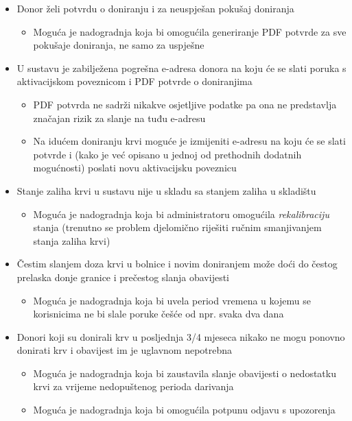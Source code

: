 {\begin{itemize}
                \item Donor želi potvrdu o doniranju i za neuspješan pokušaj doniranja
                \begin{itemize}
                    \item Moguća je nadogradnja koja bi omogućila generiranje PDF potvrde za sve pokušaje doniranja, ne samo za uspješne
                \end{itemize}
                
                \item U sustavu je zabilježena pogrešna e-adresa donora na koju će se slati poruka s aktivacijskom poveznicom i PDF potvrde o doniranjima
                \begin{itemize}
                    \item PDF potvrda ne sadrži nikakve osjetljive podatke pa ona ne predstavlja značajan rizik za slanje na tuđu e-adresu
                    \item Na idućem doniranju krvi moguće je izmijeniti e-adresu na koju će se slati potvrde i (kako je već opisano u jednoj od prethodnih dodatnih mogućnosti) poslati novu aktivacijsku poveznicu
                \end{itemize}
                
                \item Stanje zaliha krvi u sustavu nije u skladu sa stanjem zaliha u skladištu
                \begin{itemize}
                    \item Moguća je nadogradnja koja bi administratoru omogućila \textit{rekalibraciju} stanja (trenutno se problem djelomično riješiti ručnim smanjivanjem stanja zaliha krvi) 
                \end{itemize}
                
                \item Čestim slanjem doza krvi u bolnice i novim doniranjem može doći do čestog prelaska donje granice i prečestog slanja obavijesti
                \begin{itemize}
                    \item Moguća je nadogradnja koja bi uvela period vremena u kojemu se korisnicima ne bi slale poruke češće od npr. svaka dva dana
                \end{itemize}
                
                \item Donori koji su donirali krv u posljednja 3/4 mjeseca nikako ne mogu ponovno donirati krv i obavijest im je uglavnom nepotrebna
                \begin{itemize}
                    \item Moguća je nadogradnja koja bi zaustavila slanje obavijesti o nedostatku krvi za vrijeme nedopuštenog perioda darivanja
                    \item Moguća je nadogradnja koja bi omogućila potpunu odjavu s upozorenja
                \end{itemize}
                

\end{itemize}}
